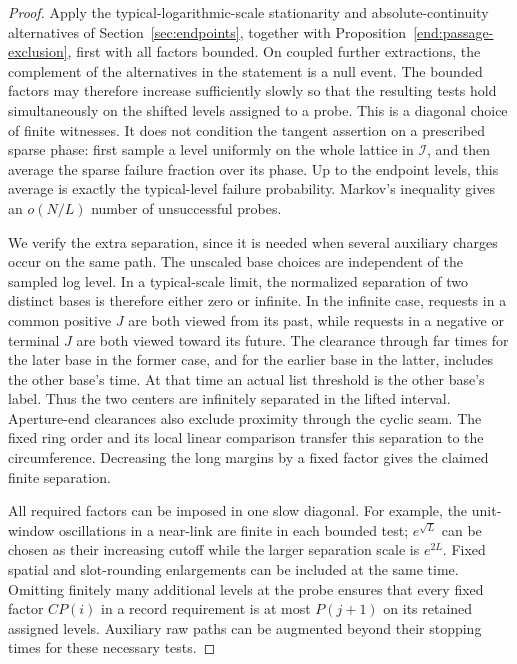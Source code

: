 \begin{proof}
Apply the typical-logarithmic-scale stationarity and absolute-continuity
alternatives of Section~\ref{sec:endpoints}, together with
Proposition~\ref{end:passage-exclusion}, first with all factors bounded.
On coupled further
extractions, the complement of the alternatives in the statement is a
null event.  The bounded factors may therefore increase sufficiently
slowly so that the resulting tests hold simultaneously on the shifted
levels assigned to a probe.  This is a diagonal choice of finite
witnesses.  It does not condition the tangent assertion on a prescribed
sparse phase: first sample a level uniformly on the whole lattice in
$\mathcal I$, and then average the sparse failure fraction over its
phase.  Up to the endpoint levels, this average is exactly the
typical-level failure probability.  Markov's inequality gives an
$o(N/L)$ number of unsuccessful probes.

We verify the extra separation, since it is needed when several
auxiliary charges occur on the same path.  The unscaled base choices
are independent of the sampled log level.  In a typical-scale limit,
the normalized separation of two distinct bases is therefore either
zero or infinite.  In the infinite case, requests in a common positive
$J$ are both viewed from its past, while requests in a negative or
terminal $J$ are both viewed toward its future.  The clearance through
far times for the later base in the former case, and for the earlier
base in the latter, includes the other base's time.  At that time an
actual list threshold is the other base's label.  Thus the two centers
are infinitely separated in the lifted interval.  Aperture-end
clearances also exclude proximity through the cyclic seam.  The fixed
ring order and its local linear comparison transfer this separation
to the circumference.  Decreasing the long margins by a fixed factor
gives the claimed finite separation.

All required factors can be imposed in one slow diagonal.  For example,
the unit-window oscillations in a near-link are finite in each bounded
test; $e^{\sqrt L}$ can be chosen as their increasing cutoff while the
larger separation scale is $e^{2L}$.  Fixed spatial and slot-rounding
enlargements can be included at the same time.  Omitting finitely many
additional levels at the probe ensures that every fixed factor
$CP(i)$ in a record requirement is at most $P(j+1)$ on its retained
assigned levels.  Auxiliary raw paths can be augmented beyond their
stopping times for these necessary tests.


\end{proof}
